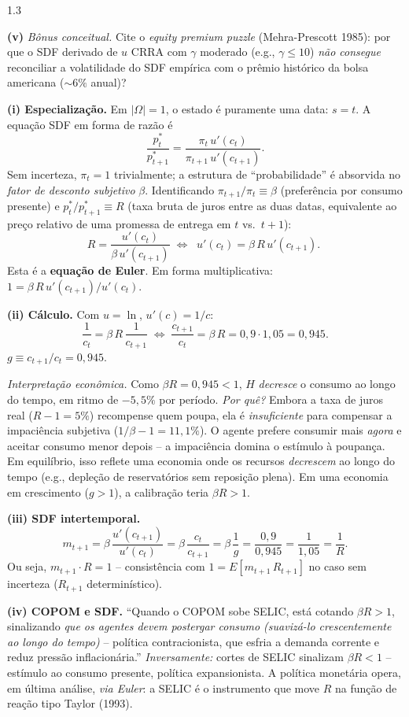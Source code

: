 \documentclass[11pt,addpoints]{exam}
\begin{document}
\begin{spacing}{1.3}
\begin{questions}
\begin{parts}
\textbf{(v)} \emph{Bônus conceitual.} Cite o \emph{equity premium puzzle} (Mehra-Prescott 1985): por que o SDF derivado de $u$ CRRA com $\gamma$ moderado (e.g., $\gamma \leq 10$) \emph{não consegue} reconciliar a volatilidade do SDF empírica com o prêmio histórico da bolsa americana ($\sim 6\%$ anual)?

\begin{solution}
\textbf{(i) Especialização.} Em $|\Omega| = 1$, o estado é puramente uma data: $s = t$. A equação SDF em forma de razão é
\[
    \frac{p^*_t}{p^*_{t+1}} = \frac{\pi_t\, u'(c_t)}{\pi_{t+1}\, u'(c_{t+1})}.
\]
Sem incerteza, $\pi_t = 1$ trivialmente; a estrutura de ``probabilidade'' é absorvida no \emph{fator de desconto subjetivo} $\beta$. Identificando $\pi_{t+1}/\pi_t \equiv \beta$ (preferência por consumo presente) e $p^*_t/p^*_{t+1} \equiv R$ (taxa bruta de juros entre as duas datas, equivalente ao preço relativo de uma promessa de entrega em $t$ vs.\ $t+1$):
\[
    R = \frac{u'(c_t)}{\beta\, u'(c_{t+1})} \;\Longleftrightarrow\; \boxed{\;u'(c_t) = \beta\, R\, u'(c_{t+1}).\;}
\]
Esta é a \textbf{equação de Euler}. Em forma multiplicativa: $1 = \beta\, R\, u'(c_{t+1})/u'(c_t)$.

\textbf{(ii) Cálculo.} Com $u = \ln$, $u'(c) = 1/c$:
\[
    \frac{1}{c_t} = \beta\, R\, \frac{1}{c_{t+1}} \;\Longleftrightarrow\; \frac{c_{t+1}}{c_t} = \beta\, R = 0{,}9\cdot 1{,}05 = 0{,}945.
\]
$\boxed{g \equiv c_{t+1}/c_t = 0{,}945.}$

\emph{Interpretação econômica.} Como $\beta R = 0{,}945 < 1$, $H$ \emph{decresce} o consumo ao longo do tempo, em ritmo de $-5{,}5\%$ por período. \emph{Por quê?} Embora a taxa de juros real ($R - 1 = 5\%$) recompense quem poupa, ela é \emph{insuficiente} para compensar a impaciência subjetiva ($1/\beta - 1 = 11{,}1\%$). O agente prefere consumir mais \emph{agora} e aceitar consumo menor depois -- a impaciência domina o estímulo à poupança. Em equilíbrio, isso reflete uma economia onde os recursos \emph{decrescem} ao longo do tempo (e.g., depleção de reservatórios sem reposição plena). Em uma economia em crescimento ($g > 1$), a calibração teria $\beta R > 1$.

\textbf{(iii) SDF intertemporal.}
\[
    m_{t+1} = \beta\, \frac{u'(c_{t+1})}{u'(c_t)} = \beta\, \frac{c_t}{c_{t+1}} = \beta\, \frac{1}{g} = \frac{0{,}9}{0{,}945} = \frac{1}{1{,}05} = \frac{1}{R}.
\]
Ou seja, $m_{t+1}\cdot R = 1$ -- consistência com $1 = E[m_{t+1}\, R_{t+1}]$ no caso sem incerteza ($R_{t+1}$ determinístico).

\textbf{(iv) COPOM e SDF.} ``Quando o COPOM sobe SELIC, está cotando $\beta R > 1$, sinalizando \emph{que os agentes devem postergar consumo (suavizá-lo crescentemente ao longo do tempo)} -- política contracionista, que esfria a demanda corrente e reduz pressão inflacionária.'' \emph{Inversamente:} cortes de SELIC sinalizam $\beta R < 1$ -- estímulo ao consumo presente, política expansionista. A política monetária opera, em última análise, \emph{via Euler}: a SELIC é o instrumento que move $R$ na função de reação tipo Taylor (1993).


\end{solution}
\end{parts}
\end{questions}
\end{spacing}
\end{document}
